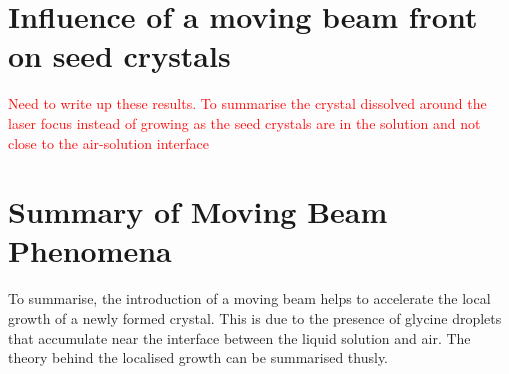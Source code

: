\section{Influence of a moving beam front on seed crystals}
\textcolor{red}{Need to write up these results. To summarise the crystal 
	dissolved around the laser focus instead of growing as the seed crystals 
	are in the solution and not close to the air-solution interface}  

\section{Summary of Moving Beam Phenomena}
To summarise, the introduction of a moving beam helps to accelerate the 
local growth of a newly formed crystal. This is due to the presence of 
glycine droplets that accumulate near the interface between the liquid 
solution and air. The theory behind the localised growth can be summarised 
thusly.

